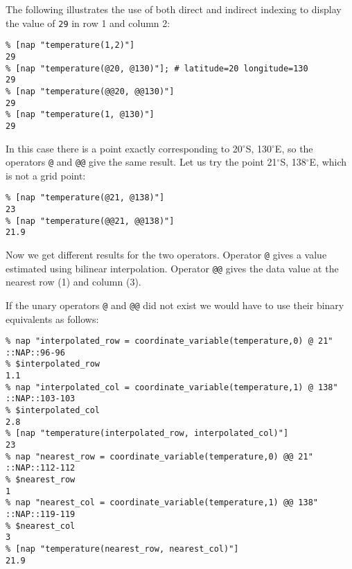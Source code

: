 The following illustrates the use of both direct and indirect
indexing to display the value of 
  \texttt{29} in row 1 and column 2:
  \begin{verbatim}
% [nap "temperature(1,2)"]
29
% [nap "temperature(@20, @130)"]; # latitude=20 longitude=130
29
% [nap "temperature(@@20, @@130)"]
29
% [nap "temperature(1, @130)"]
29
\end{verbatim}

In this case there is a point exactly corresponding to 20$^{\circ}$S,
130$^{\circ}$E, so the operators 
  \texttt{@} and 
  \texttt{@@} give the same result. Let us try the point 21$^{\circ}$S,
  138$^{\circ}$E, which is not a grid point:
  \begin{verbatim}
% [nap "temperature(@21, @138)"]
23
% [nap "temperature(@@21, @@138)"]
21.9
\end{verbatim}

Now we get different results for the two operators. Operator 
  \texttt{@} gives a value estimated using bilinear interpolation.
  Operator 
  \texttt{@@} gives the data value at the nearest row (1) and
  column (3).
  

If the unary operators 
  \texttt{@} and 
  \texttt{@@} did not exist we would have to use their binary
  equivalents as follows:
  \begin{verbatim}
% nap "interpolated_row = coordinate_variable(temperature,0) @ 21"
::NAP::96-96
% $interpolated_row
1.1
% nap "interpolated_col = coordinate_variable(temperature,1) @ 138"
::NAP::103-103
% $interpolated_col
2.8
% [nap "temperature(interpolated_row, interpolated_col)"]
23
% nap "nearest_row = coordinate_variable(temperature,0) @@ 21"
::NAP::112-112
% $nearest_row
1
% nap "nearest_col = coordinate_variable(temperature,1) @@ 138"
::NAP::119-119
% $nearest_col
3
% [nap "temperature(nearest_row, nearest_col)"]
21.9
\end{verbatim}

